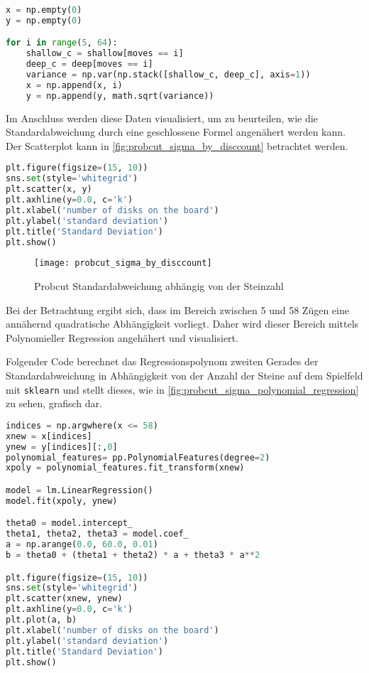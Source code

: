 \begin{lstlisting}[language=Python]
x = np.empty(0)
y = np.empty(0)

for i in range(5, 64):
    shallow_c = shallow[moves == i]
    deep_c = deep[moves == i]
    variance = np.var(np.stack([shallow_c, deep_c], axis=1))
    x = np.append(x, i)
    y = np.append(y, math.sqrt(variance))
\end{lstlisting}

Im Anschluss werden diese Daten visualisiert, um zu beurteilen, wie die
Standardabweichung durch eine geschlossene Formel angenähert werden
kann. Der Scatterplot kann in \autoref{fig:probcut_sigma_by_disccount}
betrachtet werden.

\begin{lstlisting}[language=Python]
plt.figure(figsize=(15, 10))
sns.set(style='whitegrid')
plt.scatter(x, y)
plt.axhline(y=0.0, c='k')
plt.xlabel('number of disks on the board')
plt.ylabel('standard deviation')
plt.title('Standard Deviation')
plt.show()
\end{lstlisting}

\begin{figure}[H]
    \centering
    \texttt{[image: probcut\_sigma\_by\_disccount]}
    \caption{Probcut Standardabweichung abhängig von der Steinzahl}
    \label{fig:probcut_sigma_by_disccount}
\end{figure}

Bei der Betrachtung ergibt sich, dass im Bereich zwischen 5 und 58 Zügen
eine annähernd quadratische Abhängigkeit vorliegt. Daher wird dieser
Bereich mittels Polynomieller Regression angehähert und visualisiert.

Folgender Code berechnet das Regressionspolynom zweiten Gerades der
Standardabweichung in Abhängigkeit von der Anzahl der Steine auf dem
Spielfeld mit \passthrough{\lstinline!sklearn!} und stellt dieses, wie
in \autoref{fig:probcut_sigma_polynomial_regression} zu sehen, grafisch
dar.

\begin{lstlisting}[language=Python]
indices = np.argwhere(x <= 58)
xnew = x[indices]
ynew = y[indices][:,0]
polynomial_features= pp.PolynomialFeatures(degree=2)
xpoly = polynomial_features.fit_transform(xnew)

model = lm.LinearRegression()
model.fit(xpoly, ynew)

theta0 = model.intercept_
theta1, theta2, theta3 = model.coef_
a = np.arange(0.0, 60.0, 0.01)
b = theta0 + (theta1 + theta2) * a + theta3 * a**2

plt.figure(figsize=(15, 10))
sns.set(style='whitegrid')
plt.scatter(xnew, ynew)
plt.axhline(y=0.0, c='k')
plt.plot(a, b)
plt.xlabel('number of disks on the board')
plt.ylabel('standard deviation')
plt.title('Standard Deviation')
plt.show()
\end{lstlisting}

